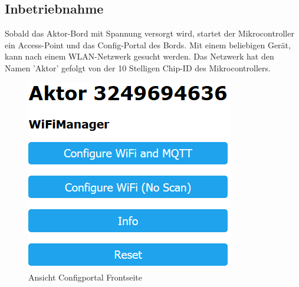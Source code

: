 \subsection{Inbetriebnahme}
Sobald das Aktor-Bord mit Spannung versorgt wird, startet der Mikrocontroller ein Access-Point und das Config-Portal des Bords. Mit einem beliebigen Gerät, kann nach einem WLAN-Netzwerk gesucht werden. Das Netzwerk hat den Namen 'Aktor' gefolgt von der 10 Stelligen Chip-ID des Mikrocontrollers. 
 
\begin{figure}[H]
	\begin{center}
	\begin{minipage}[b]{.3\linewidth} %
		\includegraphics[width=\textwidth]{graphics/Configportal.PNG}
		\caption{Ansicht Configportal Frontseite}
	\end{minipage}
	\hspace{.1\linewidth}%
	\begin{minipage}[b]{.3\linewidth} %

\end{minipage}
\end{center}
\end{figure}
